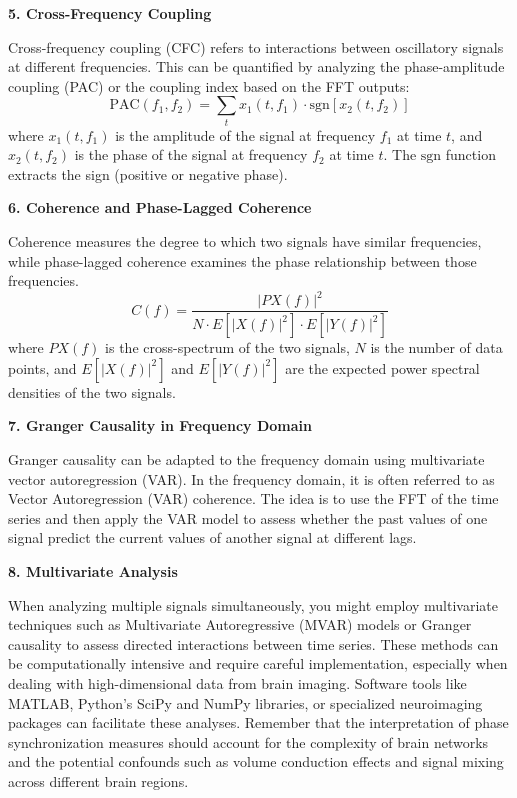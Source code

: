 \documentclass[twocolumn]{article}
\begin{document}
\noindent \textbf{5. Cross-Frequency Coupling}

Cross-frequency coupling (CFC) refers to interactions between oscillatory signals at different frequencies. This can be quantified by analyzing the
phase-amplitude coupling (PAC) or the coupling index based on the FFT outputs:
$$\mathrm{PAC}(f_1, f_2) = \sum_{t} x_1(t, f_1) \cdot \text{sgn}[x_2(t, f_2)]$$
where $x_1(t, f_1)$ is the amplitude of the signal at frequency $f_1$ at time $t$, and $x_2(t, f_2)$ is the phase of the signal at frequency $f_2$ at
time $t$. The $\text{sgn}$ function extracts the sign (positive or negative phase).

\noindent \textbf{6. Coherence and Phase-Lagged Coherence}

Coherence measures the degree to which two signals have similar frequencies, while phase-lagged coherence examines the phase relationship between those
frequencies.
$$C(f) = \frac{|PX(f)|^2}{N \cdot E[|X(f)|^2] \cdot E[|Y(f)|^2]}$$
where $PX(f)$ is the cross-spectrum of the two signals, $N$ is the number of data points, and $E[|X(f)|^2]$ and $E[|Y(f)|^2]$ are the expected power
spectral densities of the two signals.

\noindent \textbf{7. Granger Causality in Frequency Domain}

Granger causality can be adapted to the frequency domain using multivariate vector autoregression (VAR). In the frequency domain, it is often referred to
as Vector Autoregression (VAR) coherence. The idea is to use the FFT of the time series and then apply the VAR model to assess whether the past values of one
signal predict the current values of another signal at different lags.

\noindent \textbf{8. Multivariate Analysis}

When analyzing multiple signals simultaneously, you might employ multivariate techniques such as Multivariate Autoregressive (MVAR) models or Granger
causality to assess directed interactions between time series. These methods can be computationally intensive and require careful implementation,
especially when dealing with high-dimensional data from brain imaging. Software tools like MATLAB, Python's SciPy and NumPy libraries, or specialized
neuroimaging packages can facilitate these analyses. Remember that the interpretation of phase synchronization measures should account for the complexity
of brain networks and the potential confounds such as volume conduction effects and signal mixing across different brain regions.
\end{document}
